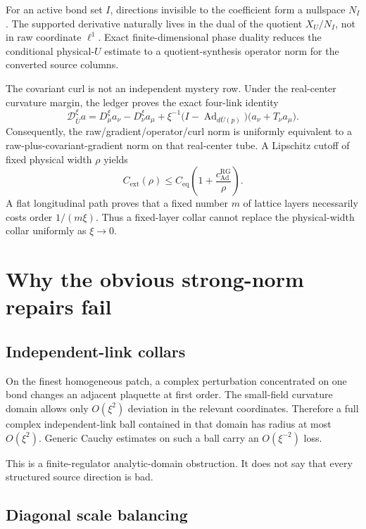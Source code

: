\documentclass[11pt]{article}
\theoremstyle{definition}
\begin{document}
For an active bond set \(I\), directions invisible to the coefficient form
a nullspace \(N_I\).  The supported derivative naturally lives in the dual
of the quotient \(X_U/N_I\), not in raw coordinate \(\ell^1\).  Exact
finite-dimensional phase duality reduces the conditional physical-\(U\)
estimate to a quotient-synthesis operator norm for the converted source
columns.

The covariant curl is not an independent mystery row.  Under the real-center
curvature margin, the ledger proves the exact four-link identity
\[
\mathcal D_{\bar U}^{\xi}a
=
D_\mu^\xi a_\nu-D_\nu^\xi a_\mu
+
\xi^{-1}
\bigl(I-\operatorname{Ad}_{d\bar U(p)}\bigr)
\bigl(a_\nu+T_\nu a_\mu\bigr).
\tag{4.4}
\]
Consequently, the raw/gradient/operator/curl norm is uniformly equivalent
to a raw-plus-covariant-gradient norm on that real-center tube.  A Lipschitz
cutoff of fixed physical width \(\rho\) yields
\[
C_{\mathrm{ext}}(\rho)
\le C_{\mathrm{eq}}
\left(1+\frac{c_{\mathrm{Ad}}^{\mathrm{RG}}}{\rho}\right).
\tag{4.5}
\]
A flat longitudinal path proves that a fixed number \(m\) of lattice layers
necessarily costs order \(1/(m\xi)\).  Thus a fixed-layer collar cannot
replace the physical-width collar uniformly as \(\xi\to0\).

\section{Why the obvious strong-norm repairs fail}

\subsection{Independent-link collars}

On the finest homogeneous patch, a complex perturbation concentrated on one
bond changes an adjacent plaquette at first order.  The small-field
curvature domain allows only \(O(\xi^2)\) deviation in the relevant
coordinates.  Therefore a full complex independent-link ball contained in
that domain has radius at most \(O(\xi^2)\).  Generic Cauchy estimates on
such a ball carry an \(O(\xi^{-2})\) loss.

This is a finite-regulator analytic-domain obstruction.  It does not say
that every structured source direction is bad.

\subsection{Diagonal scale balancing}
\end{document}
